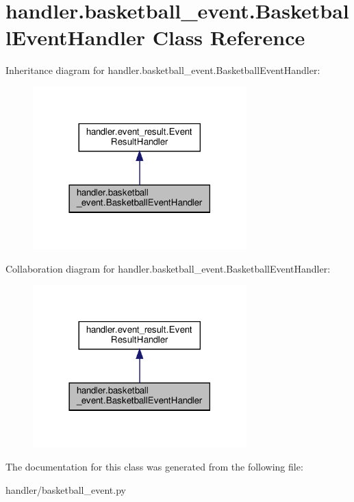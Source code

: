\hypertarget{classhandler_1_1basketball__event_1_1_basketball_event_handler}{}\section{handler.\+basketball\+\_\+event.\+Basketball\+Event\+Handler Class Reference}
\label{classhandler_1_1basketball__event_1_1_basketball_event_handler}


Inheritance diagram for handler.\+basketball\+\_\+event.\+Basketball\+Event\+Handler\+:\nopagebreak
\begin{figure}[H]
\begin{center}
\leavevmode
\includegraphics[width=234pt]{classhandler_1_1basketball__event_1_1_basketball_event_handler__inherit__graph}
\end{center}
\end{figure}


Collaboration diagram for handler.\+basketball\+\_\+event.\+Basketball\+Event\+Handler\+:\nopagebreak
\begin{figure}[H]
\begin{center}
\leavevmode
\includegraphics[width=234pt]{classhandler_1_1basketball__event_1_1_basketball_event_handler__coll__graph}
\end{center}
\end{figure}


The documentation for this class was generated from the following file\+:\begin{DoxyCompactItemize}
\item 
handler/basketball\+\_\+event.\+py\end{DoxyCompactItemize}
